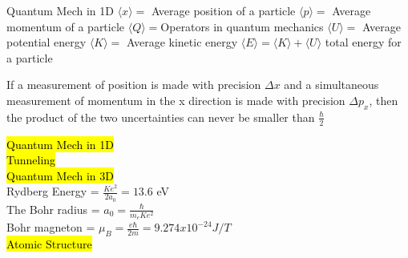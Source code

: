 \documentclass[6pt, oneside]{article}   	%
\begin{document}
\colorbox{BurntOrange}{Quantum Mech in 1D}
$\langle x \rangle =$ Average position of a particle
$\langle p \rangle =$ Average momentum of a particle
$\langle Q \rangle =$Operators in quantum mechanics
$\langle U \rangle =$ Average potential energy
$\langle K \rangle =$ Average kinetic energy
$\langle E \rangle = \langle K \rangle + \langle U \rangle $ total energy for a particle



If a measurement of position is made with precision $\Delta x$ and a simultaneous measurement of momentum in the x direction is made with precision $\Delta p_x$, then the product of the two uncertainties can never be smaller than $\frac{\hbar}{2}$

\hl{Quantum Mech in 1D}\\
\hl{Tunneling}\\
\hl{Quantum Mech in 3D}\\
Rydberg Energy = $\frac{Ke^2}{2a_0} = 13.6$ eV\\
The Bohr radius = $a_0 = \frac{\hbar}{m_eKe^2}$\\
Bohr magneton = $\mu_B = \frac{e\hbar}{2m} = 9.274x10^{-24} J/T$\\
\hl{Atomic Structure}\\
\end{document}

